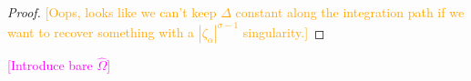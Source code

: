 \documentclass{article}
\let\Re\relax
\DeclareMathOperator{\Re}{Re}
\newcommand{\R}{\mathbb{R}}
\newcommand{\laplace}{\mathcal{L}}
\theoremstyle{definition}
\theoremstyle{plain}
\begin{document}
\begin{proof}
\textcolor{orange}{[Oops, looks like we can't keep $\Delta$ constant along the integration path if we want to recover something with a $|\zeta_\alpha|^{\sigma-1}$ singularity.]}
\end{proof}
\textcolor{magenta}{[Introduce bare $\widehat{\Omega}$]}
\color{black}
%
\end{document}
